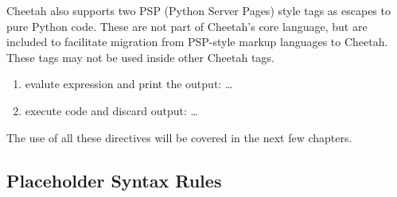 Cheetah also supports two PSP (Python Server Pages) style tags as escapes to
pure Python code. These are not part of Cheetah's core language, but are
included to facilitate migration from PSP-style markup languages to Cheetah.
These tags may not be used inside other Cheetah tags.
\begin{enumerate}
\item evalute expression and print the output: \code{<\%=} \ldots \code{\%>} 
\item execute code and discard output: \code{<\%} \ldots \code{\%>}
\end{enumerate}

The use of all these directives will be covered in the next few chapters.



\subsection{Placeholder Syntax Rules}
\label{language.placeholders.syntax}

